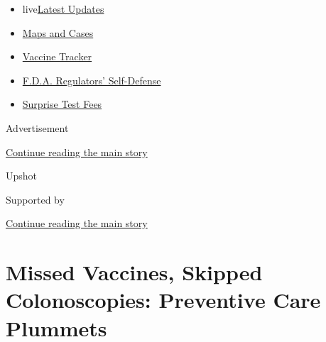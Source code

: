 \begin{itemize}
\tightlist
\item
  live\href{https://www.nytimes3xbfgragh.onion/2020/09/12/world/covid-19-coronavirus.html?name=styln-coronavirus-national\&region=TOP_BANNER\&block=storyline_menu_recirc\&action=click\&pgtype=Article\&impression_id=271846d0-f52c-11ea-bb3a-a9cd15cea7c9\&variant=undefined}{Latest
  Updates}
\item
  \href{https://www.nytimes3xbfgragh.onion/interactive/2020/us/coronavirus-us-cases.html?name=styln-coronavirus-national\&region=TOP_BANNER\&block=storyline_menu_recirc\&action=click\&pgtype=Article\&impression_id=271846d1-f52c-11ea-bb3a-a9cd15cea7c9\&variant=undefined}{Maps
  and Cases}
\item
  \href{https://www.nytimes3xbfgragh.onion/interactive/2020/science/coronavirus-vaccine-tracker.html?name=styln-coronavirus-national\&region=TOP_BANNER\&block=storyline_menu_recirc\&action=click\&pgtype=Article\&impression_id=271846d2-f52c-11ea-bb3a-a9cd15cea7c9\&variant=undefined}{Vaccine
  Tracker}
\item
  \href{https://www.nytimes3xbfgragh.onion/2020/09/10/us/politics/fda-coronavirus-vaccine.html?name=styln-coronavirus-national\&region=TOP_BANNER\&block=storyline_menu_recirc\&action=click\&pgtype=Article\&impression_id=271846d3-f52c-11ea-bb3a-a9cd15cea7c9\&variant=undefined}{F.D.A.
  Regulators' Self-Defense}
\item
  \href{https://www.nytimes3xbfgragh.onion/2020/09/09/upshot/coronavirus-surprise-test-fees.html?name=styln-coronavirus-national\&region=TOP_BANNER\&block=storyline_menu_recirc\&action=click\&pgtype=Article\&impression_id=271846d4-f52c-11ea-bb3a-a9cd15cea7c9\&variant=undefined}{Surprise
  Test Fees}
\end{itemize}

Advertisement

\protect\hyperlink{after-top}{Continue reading the main story}

Upshot

Supported by

\protect\hyperlink{after-sponsor}{Continue reading the main story}

\hypertarget{missed-vaccines-skipped-colonoscopies-preventive-care-plummets}{%
\section{Missed Vaccines, Skipped Colonoscopies: Preventive Care
Plummets}\label{missed-vaccines-skipped-colonoscopies-preventive-care-plummets}}

